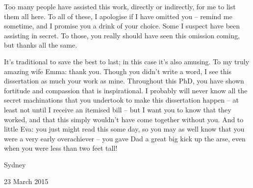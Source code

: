 Too many people have assisted this work, directly or indirectly, for me to list them all here.  To all of these, I apologise if I have omitted you -- remind me sometime, and I promise you a drink of your choice.  Some I suspect have been assisting in secret.  To those, you really should have seen this omission coming, but thanks all the same.

It's traditional to save the best to last; in this case it's also amusing.  To my truly amazing wife Emma: thank you.  Though you didn't write a word, I see this dissertation as much your work as mine.  Throughout this PhD, you have shown fortitude and compassion that is inspirational.  I probably will never know all the secret machinations that you undertook to make this dissertation happen -- at least not until I receive an itemised bill -- but I want you to know that they worked, and that this simply wouldn't have come together without you.  And to little Eva: you just might read this some day, so you may as well know that you were a very early overachiever -- you gave Dad a great big kick up the arse, even when you were less than two feet tall!

\vspace{15mm}

\hspace{70mm}Sydney

\hspace{70mm}23 March 2015